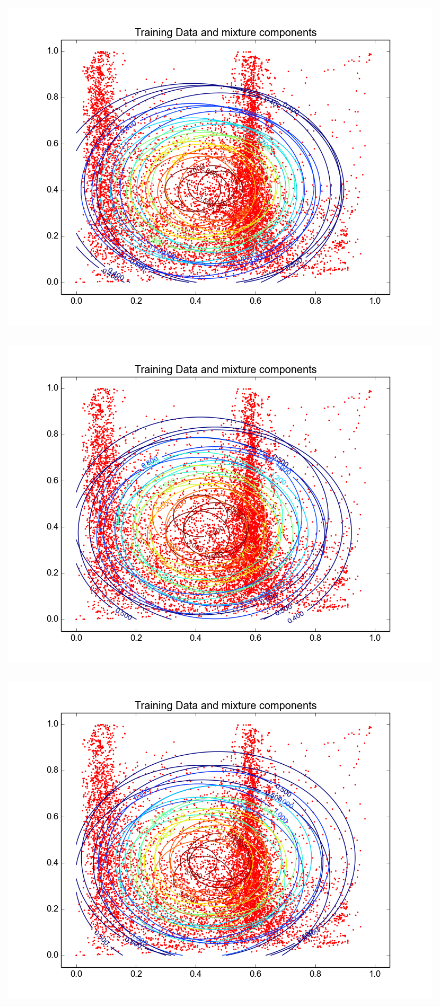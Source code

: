 \documentclass[11pt,a4paper]{article}
\begin{document}
\begin{minipage}[b]{0.25\textwidth}
\begin{figure}[H]
  \centering
  \includegraphics[width=.8\linewidth]{Figures/contours_diagcoast0.png}
\end{figure}%
\end{minipage}
\begin{minipage}[b]{0.25\textwidth}
\begin{figure}[H]
  \centering
  \includegraphics[width=.8\linewidth]{Figures/contours_diagcoast5.png}

  \label{fig:sfig1}
\end{figure}%
\end{minipage}
\begin{minipage}[b]{0.25\textwidth}
\begin{figure}[H]
  \centering
  \includegraphics[width=.8\linewidth]{Figures/contours_diagcoast15.png}

  \label{fig:sfig1}
\end{figure}%
\end{minipage}
\end{document}
